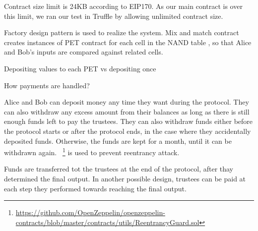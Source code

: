 Contract size limit is 24KB according to EIP170. As our main contract is over this limit, we ran our test in Truffle by allowing unlimited contract size.

Factory design pattern is used to realize the system. Mix and match contract creates instances of PET contract for each cell in the NAND table , so that Alice and Bob's inputs are compared against related cells.

Depositing values to each PET vs depositing once

How payments are handled? 

Alice and Bob can deposit money any time they want during the protocol. They can also withdraw any excess amount from their balances as long as there is still enough funds left to pay the trustees. They can also withdraw funds either before the protocol starts or after the protocol ends, in the case where they accidentally deposited funds. Otherwise, the funds are kept for a month, until it can be withdrawn again. ~\footnote{\url{https://github.com/OpenZeppelin/openzeppelin-contracts/blob/master/contracts/utils/ReentrancyGuard.sol}} is used to prevent reentrancy attack.

Funds are transferred tot the trustees at the end of the protocol, after thay determined the final output. In another possible design, trustees can be paid at each step they performed towards reaching the final output.


